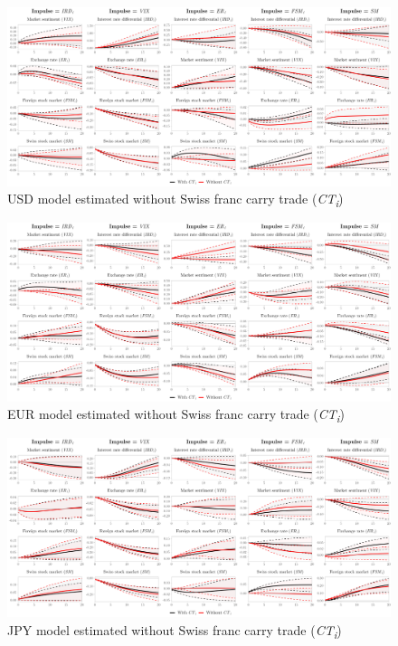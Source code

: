 \documentclass[a4paper, twoside]{templates/ociamthesis}
\begin{document}
\begin{figure}[!ht]

{\centering \includegraphics[width=0.99\columnwidth]{figure/gUSD_COIRF_ROB1_ALL_FINAL} 

}

\caption{USD model estimated without Swiss franc carry trade (\textit{CT\textsubscript{i}})}\label{fig:FigureD7}
\end{figure}

\begin{figure}[!ht]

{\centering \includegraphics[width=0.99\columnwidth]{figure/gEUR_COIRF_ROB1_ALL_FINAL} 

}

\caption{EUR model estimated without Swiss franc carry trade (\textit{CT\textsubscript{i}})}\label{fig:FigureD8}
\end{figure}

\clearpage

\begin{figure}[!ht]

{\centering \includegraphics[width=0.99\columnwidth]{figure/gJPY_COIRF_ROB1_ALL_FINAL} 

}

\caption{JPY model estimated without Swiss franc carry trade (\textit{CT\textsubscript{i}})}\label{fig:FigureD9}
\end{figure}
\end{document}
